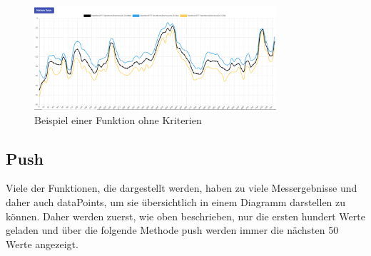 \begin{figure}[H]
    \centering
    \includegraphics[width=0.80\textwidth]{pics/graphwok.PNG}
    \caption{Beispiel einer Funktion ohne Kriterien}
    \label{fig:graphwok}
\end{figure}

\subsection{Push}
Viele der Funktionen, die dargestellt werden, haben zu viele Messergebnisse und daher auch dataPoints, um sie übersichtlich in einem
Diagramm darstellen zu können. Daher werden zuerst, wie oben beschrieben, nur die ersten hundert Werte geladen und über die folgende
Methode push werden immer die nächsten 50 Werte angezeigt. 


